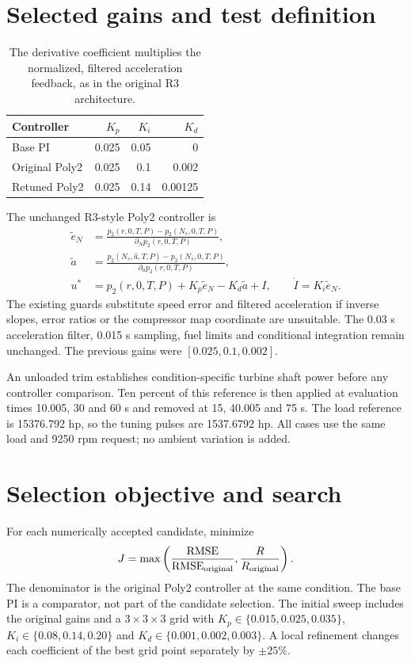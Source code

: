 \documentclass[11pt,a4paper]{article}
\begin{document}
\section{Selected gains and test definition}
\begin{table}[H]\centering\small\begin{tabular}{lrrr}\toprule
Controller & $K_p$ & $K_i$ & $K_d$\\\midrule
Base PI & 0.025 & 0.05 & 0\\
Original Poly2 & 0.025 & 0.1 & 0.002\\
Retuned Poly2 & 0.025 & 0.14 & 0.00125\\
\bottomrule\end{tabular}\caption{The derivative coefficient multiplies the normalized, filtered acceleration feedback, as in the original R3 architecture.}\end{table}
The unchanged R3-style Poly2 controller is
\begin{align}
\tilde e_N&=\frac{p_2(r,0,T,P)-p_2(N_s,0,T,P)}{\partial_N p_2(r,0,T,P)},\\
\tilde a&=\frac{p_2(N_s,\hat a,T,P)-p_2(N_s,0,T,P)}{\partial_a p_2(r,0,T,P)},\\
u^*&=p_2(r,0,T,P)+K_p\tilde e_N-K_d\tilde a+I,\qquad \dot I=K_i\tilde e_N.
\end{align}
The existing guards substitute speed error and filtered acceleration if inverse slopes, error ratios or the compressor map coordinate are unsuitable. The 0.03 s acceleration filter, 0.015 s sampling, fuel limits and conditional integration remain unchanged. The previous gains were $[0.025,0.1,0.002]$.

An unloaded trim establishes condition-specific turbine shaft power before any controller comparison. Ten percent of this reference is then applied at evaluation times 10.005, 30 and 60 s and removed at 15, 40.005 and 75 s. The load reference is 15376.792 hp, so the tuning pulses are 1537.6792 hp. All cases use the same load and 9250 rpm request; no ambient variation is added.
\section{Selection objective and search}
For each numerically accepted candidate, minimize
\begin{equation}
J=\max\left(\frac{\mathrm{RMSE}}{\mathrm{RMSE}_{\rm original}},\frac{R}{R_{\rm original}}\right).
\end{equation}
The denominator is the original Poly2 controller at the same condition. The base PI is a comparator, not part of the candidate selection. The initial sweep includes the original gains and a $3\times3\times3$ grid with $K_p\in\{0.015,0.025,0.035\}$, $K_i\in\{0.08,0.14,0.20\}$ and $K_d\in\{0.001,0.002,0.003\}$. A local refinement changes each coefficient of the best grid point separately by $\pm25\%$.
\end{document}
